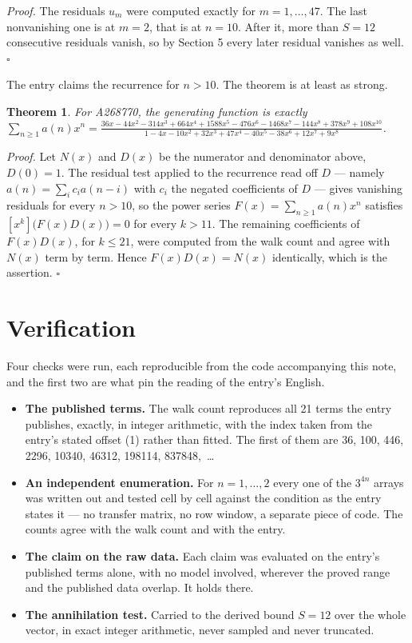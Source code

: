 \documentclass[11pt]{article}
\newtheorem{theorem}{Theorem}
\theoremstyle{definition}
\begin{document}
{\itshape Proof.} The residuals $u_m$ were computed exactly for $m = 1,\dots,47$. The last nonvanishing one is at $m = 2$, that is at $n = 10$. After it, more than $S = 12$ consecutive residuals vanish, so by Section 5 every later residual vanishes as well. $\square$

The entry claims the recurrence for $n > 10$. The theorem is at least as strong.

\begin{theorem} For A268770, the generating function is exactly $\sum_{n\ge 1} a(n)x^n = \frac{36x - 44x^{2} - 314x^{3} + 664x^{4} + 1588x^{5} - 476x^{6} - 1468x^{7} - 144x^{8} + 378x^{9} + 108x^{10}}{1 - 4x - 10x^{2} + 32x^{3} + 47x^{4} - 40x^{5} - 38x^{6} + 12x^{7} + 9x^{8}}$.\end{theorem}

{\itshape Proof.} Let $N(x)$ and $D(x)$ be the numerator and denominator above, $D(0)=1$. The residual test applied to the recurrence read off $D$ --- namely $a(n) = \sum_i c_i a(n-i)$ with $c_i$ the negated coefficients of $D$ --- gives vanishing residuals for every $n > 10$, so the power series $F(x)=\sum_{n\ge 1}a(n)x^n$ satisfies $[x^k]\bigl(F(x)D(x)\bigr) = 0$ for every $k > 11$. The remaining coefficients of $F(x)D(x)$, for $k \le 21$, were computed from the walk count and agree with $N(x)$ term by term. Hence $F(x)D(x) = N(x)$ identically, which is the assertion. $\square$

\section{Verification}

Four checks were run, each reproducible from the code accompanying this note, and the first two are what pin the reading of the entry's English.

\begin{itemize}

\item {\bfseries The published terms.} The walk count reproduces all 21 terms the entry publishes, exactly, in integer arithmetic, with the index taken from the entry's stated offset (1) rather than fitted. The first of them are 36, 100, 446, 2296, 10340, 46312, 198114, 837848,~\dots

\item {\bfseries An independent enumeration.} For $n = 1,\dots,2$ every one of the $3^{4n}$ arrays was written out and tested cell by cell against the condition as the entry states it --- no transfer matrix, no row window, a separate piece of code. The counts agree with the walk count and with the entry.

\item {\bfseries The claim on the raw data.} Each claim was evaluated on the entry's published terms alone, with no model involved, wherever the proved range and the published data overlap. It holds there.

\item {\bfseries The annihilation test.} Carried to the derived bound $S = 12$ over the whole vector, in exact integer arithmetic, never sampled and never truncated.

\end{itemize}
\end{document}

